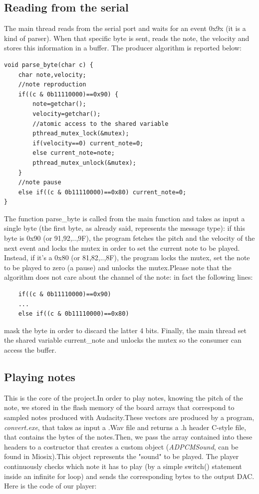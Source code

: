 \documentclass[12pt]{article}
\begin{document}
\subsection{Reading from the serial}\label{subsec:reading}
The main thread reads from the serial port and waits for an event 0x9x (it is a kind of parser). When that specific byte is sent, reads the note, the velocity and stores this information in a buffer. The producer algorithm is reported below:
\begin{lstlisting}
void parse_byte(char c) {
	char note,velocity;
	//note reproduction
	if((c & 0b11110000)==0x90) {
		note=getchar();
		velocity=getchar();
		//atomic access to the shared variable
		pthread_mutex_lock(&mutex);
		if(velocity==0) current_note=0;
		else current_note=note;
		pthread_mutex_unlock(&mutex);
	}
	//note pause
	else if((c & 0b11110000)==0x80) current_note=0;
}
\end{lstlisting}
The function parse\_byte is called from the main function and takes as input a single byte (the first byte, as already said, represents the message type): if this byte is 0x90 (or 91,92,..,9F), the program fetches the pitch and the velocity of the next event and locks the mutex in order to set the current note to be played. Instead, if it's a 0x80 (or 81,82,..,8F), the program locks the mutex, set the note to be played to zero (a pause) and unlocks the mutex.Please note that the algorithm does not care about the channel of the note: in fact the following lines:
\begin{lstlisting}
	if((c & 0b11110000)==0x90)
	...
	else if((c & 0b11110000)==0x80)
\end{lstlisting}
mask the byte in order to discard the latter 4 bits.\newline
Finally, the main thread set the shared variable current\_note and unlocks the mutex so the consumer can access the buffer.

\subsection{Playing notes}
This is the core of the project.In order to play notes, knowing the pitch of the note, we stored in the flash memory of the board arrays that correspond to sampled notes produced with Audacity.These vectors are produced by a program, \textit{convert.exe}, that takes as input a .Wav file and returns a .h header C-style file, that contains the bytes of the notes.Then, we pass the array contained into these headers to a costructor that creates a custom object (\textit{ADPCMSound}, can be found in Miosix).This object represents the "sound" to be played.\newline
The player continuously checks which note it has to play (by a simple switch() statement inside an infinite for loop) and sends the corresponding bytes to the output DAC. Here is the code of our player:\newpage
\end{document}
